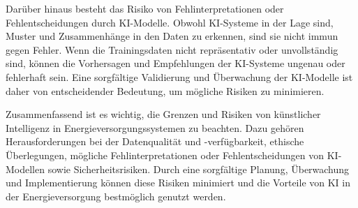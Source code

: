 Darüber hinaus besteht das Risiko von Fehlinterpretationen oder
Fehlentscheidungen durch KI-Modelle. Obwohl KI-Systeme in der Lage sind, Muster
und Zusammenhänge in den Daten zu erkennen, sind sie nicht immun gegen Fehler.
Wenn die Trainingsdaten nicht repräsentativ oder unvollständig sind, können die
Vorhersagen und Empfehlungen der KI-Systeme ungenau oder fehlerhaft sein. Eine
sorgfältige Validierung und Überwachung der KI-Modelle ist daher von
entscheidender Bedeutung, um mögliche Risiken zu minimieren.

Zusammenfassend ist es wichtig, die Grenzen und Risiken von künstlicher
Intelligenz in Energieversorgungssystemen zu beachten. Dazu gehören
Herausforderungen bei der Datenqualität und -verfügbarkeit, ethische
Überlegungen, mögliche Fehlinterpretationen oder Fehlentscheidungen von
KI-Modellen sowie Sicherheitsrisiken. Durch eine sorgfältige Planung,
Überwachung und Implementierung können diese Risiken minimiert und die Vorteile
von KI in der Energieversorgung bestmöglich genutzt werden.